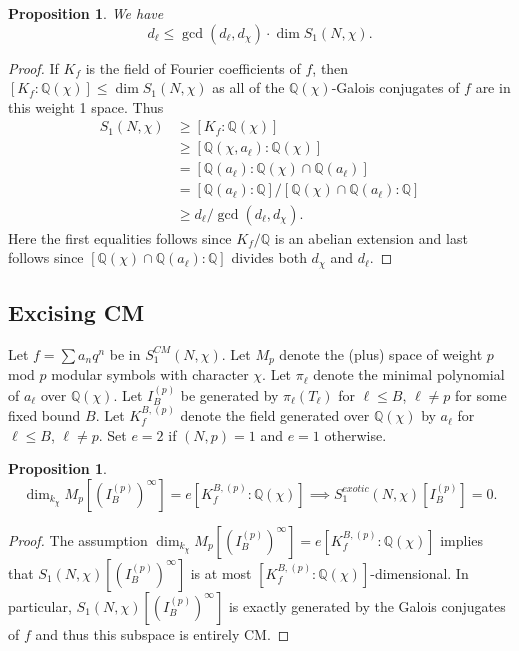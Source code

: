 \documentclass[11pt]{amsart}
\theoremstyle{plain}
\newtheorem{prop}[thm]{Proposition}
\theoremstyle{definition}
\newcommand{\Q}{{\mathbb Q}}
\renewcommand{\[}{\left[}
\renewcommand{\]}{\right]}
\begin{document}
\begin{prop}
We have
$$
d_\ell \leq \gcd(d_\ell,d_\chi) \cdot \dim S_1(N,\chi).
$$
\end{prop}

\begin{proof}
If $K_f$ is the field of Fourier coefficients of $f$, then $[K_f:\Q(\chi)] \leq \dim S_1(N,\chi)$ as all of the $\Q(\chi)$-Galois conjugates of $f$ are in this weight 1 space.  Thus
\begin{align*}
S_1(N,\chi) 
&\geq [K_f:\Q(\chi)] \\
&\geq [\Q(\chi,a_\ell):\Q(\chi)] \\
&= [\Q(a_\ell):\Q(\chi) \cap \Q(a_\ell)] \\
&= [\Q(a_\ell):\Q] / [\Q(\chi) \cap \Q(a_\ell):\Q] \\
&\geq d_\ell / \gcd(d_\ell, d_\chi).
\end{align*}
Here the first equalities follows since $K_f/\Q$ is an abelian extension and last follows since $[\Q(\chi) \cap \Q(a_\ell):\Q]$ divides both $d_\chi$ and $d_\ell$.
\end{proof}
\vfill
\pagebreak
\subsection{Excising CM}

Let $f=\sum a_n q^n$ be in $S_1^{CM}(N,\chi)$.  Let $M_p$ denote the (plus) space of weight $p$ mod $p$ modular symbols with character $\chi$.  Let $\pi_\ell$ denote the minimal polynomial of $a_\ell$ over $\Q(\chi)$.  Let $I^{(p)}_B$ be generated by $\pi_\ell(T_\ell)$ for $\ell \leq B$, $\ell \neq p$ for some fixed bound $B$.  Let $K_f^{B,(p)}$ denote the field generated over $\Q(\chi)$ by $a_\ell$ for $\ell \leq B$, $\ell \neq p$.  
Set $e=2$ if $(N,p)=1$ and $e=1$ otherwise.

\begin{prop}
$$\dim_{k_\chi} M_p[(I^{(p)}_B)^\infty] = e [K_f^{B,(p)}:\Q(\chi)] \implies
S_1^{exotic}(N,\chi)[I^{(p)}_B] = 0.
$$
\end{prop}

\begin{proof}
The assumption $\dim_{k_\chi} M_p[(I^{(p)}_B)^\infty] = e [K_f^{B,(p)}:\Q(\chi)]$ implies that $S_1(N,\chi)[(I^{(p)}_B)^\infty]$ is at most $[K_f^{B,(p)}:\Q(\chi)]$-dimensional.
In particular, $S_1(N,\chi)[(I^{(p)}_B)^\infty]$ is exactly generated by the Galois conjugates of $f$ and thus this subspace is entirely CM.
\end{proof}
\end{document}
